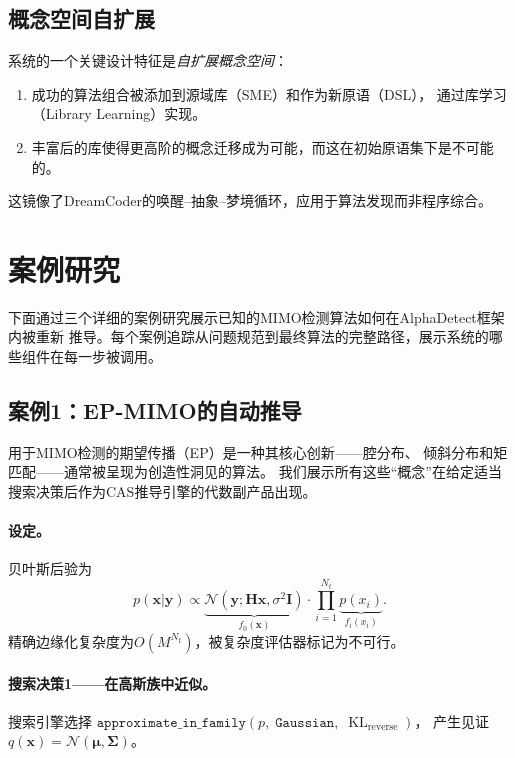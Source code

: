 \documentclass[12pt,a4paper]{article}
\newcommand{\bH}{\mathbf{H}}
\newcommand{\bx}{\mathbf{x}}
\newcommand{\by}{\mathbf{y}}
\newcommand{\bI}{\mathbf{I}}
\newcommand{\bmu}{\bm{\mu}}
\newcommand{\bSigma}{\bm{\Sigma}}
\newcommand{\calN}{\mathcal{N}}
\DeclareMathOperator{\KL}{KL}
\begin{document}
\subsection{概念空间自扩展}

系统的一个关键设计特征是\emph{自扩展概念空间}：
\begin{enumerate}[itemsep=0pt]
  \item 成功的算法组合被添加到源域库（SME）和作为新原语（DSL），
        通过库学习（Library Learning）\cite{dreamcoder2021}实现。
  \item 丰富后的库使得更高阶的概念迁移成为可能，而这在初始原语集下是不可能的。
\end{enumerate}
这镜像了DreamCoder的唤醒--抽象--梦境循环，应用于算法发现而非程序综合。

\section{案例研究}
\label{sec:cases}

下面通过三个详细的案例研究展示已知的MIMO检测算法如何在AlphaDetect框架内被重新
推导。每个案例追踪从问题规范到最终算法的完整路径，展示系统的哪些组件在每一步被调用。

\subsection{案例1：EP-MIMO的自动推导}
\label{sec:ep_derivation}

用于MIMO检测的期望传播（EP）\cite{minka2001}是一种其核心创新——腔分布、
倾斜分布和矩匹配——通常被呈现为创造性洞见的算法。
我们展示所有这些``概念''在给定适当搜索决策后作为CAS推导引擎的代数副产品出现。

\paragraph{设定。}
贝叶斯后验为
\begin{equation}
  p(\bx|\by) \propto \underbrace{\calN(\by;\bH\bx,\sigma^2\bI)}_{f_0(\bx)}
  \cdot \prod_{i=1}^{N_t}\underbrace{p(x_i)}_{f_i(x_i)}.
  \label{eq:posterior}
\end{equation}
精确边缘化复杂度为$O(M^{N_t})$，被复杂度评估器标记为不可行。

\paragraph{搜索决策1——在高斯族中近似。}
搜索引擎选择
$\mathtt{approximate\_in\_family}(p,\;\mathtt{Gaussian},\;\KL_\text{reverse})$，
产生见证$q(\bx)=\calN(\bmu,\bSigma)$。
\end{document}
